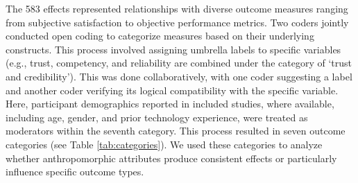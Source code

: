 \documentclass[preprint,review,12pt,authoryear,nonatbib]{elsarticle}
\begin{document}
The 583 effects represented relationships with diverse outcome measures ranging from subjective satisfaction to objective performance metrics. Two coders jointly conducted open coding to categorize measures based on their underlying constructs. This process involved assigning umbrella labels to specific variables (e.g., trust, competency, and reliability are combined under the category of `trust and credibility'). This was done collaboratively, with one coder suggesting a label and another coder verifying its logical compatibility with the specific variable. %
Here, participant demographics reported in included studies, where available, including age, gender, and prior technology experience, were treated as moderators within the seventh category.
This process resulted in seven outcome categories (see Table \ref{tab:categories}). We used these categories to analyze whether anthropomorphic attributes produce consistent effects or particularly influence specific outcome types. %
\end{document}
